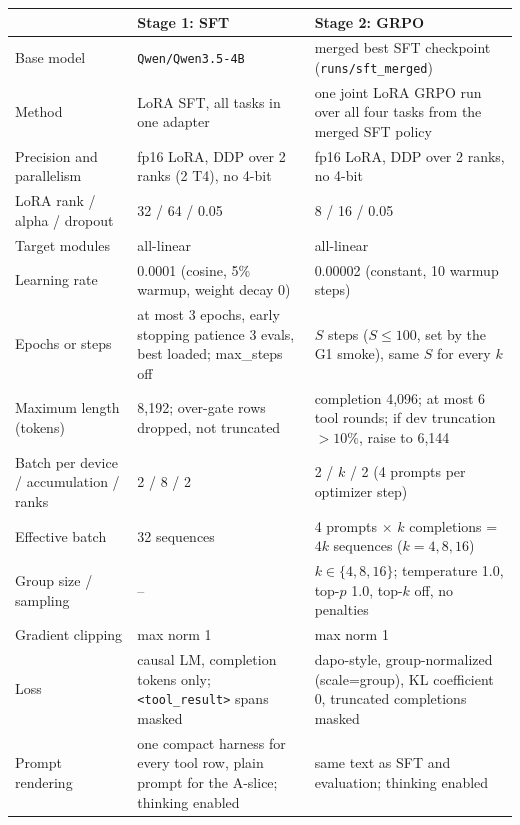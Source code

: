 \begingroup\small\renewcommand{\arraystretch}{1.12}
\begin{tabular}{@{}p{4.2cm}p{5.4cm}p{5.6cm}@{}}
\toprule
 & Stage 1: SFT & Stage 2: GRPO \\
\midrule
Base model & \texttt{Qwen/Qwen3.5-4B} & merged best SFT checkpoint (\texttt{runs/sft\_merged}) \\
Method & LoRA SFT, all tasks in one adapter & one joint LoRA GRPO run over all four tasks from the merged SFT policy \\
Precision and parallelism & fp16 LoRA, DDP over 2 ranks (2 T4), no 4-bit & fp16 LoRA, DDP over 2 ranks, no 4-bit \\
LoRA rank / alpha / dropout & 32 / 64 / 0.05 & 8 / 16 / 0.05 \\
Target modules & all-linear & all-linear \\
Learning rate & 0.0001 (cosine, 5\% warmup, weight decay 0) & 0.00002 (constant, 10 warmup steps) \\
Epochs or steps & at most 3 epochs, early stopping patience 3 evals, best loaded; max\_steps off & $S$ steps ($S\le100$, set by the G1 smoke), same $S$ for every $k$ \\
Maximum length (tokens) & 8{,}192; over-gate rows dropped, not truncated & completion 4{,}096; at most 6 tool rounds; if dev truncation $>10\%$, raise to 6{,}144 \\
Batch per device / accumulation / ranks & 2 / 8 / 2 & 2 / $k$ / 2 (4 prompts per optimizer step) \\
Effective batch & 32 sequences & 4 prompts $\times$ $k$ completions = $4k$ sequences ($k=4,8,16$) \\
Group size / sampling & -- & $k\in\{4,8,16\}$; temperature 1.0, top-$p$ 1.0, top-$k$ off, no penalties \\
Gradient clipping & max norm 1 & max norm 1 \\
Loss & causal LM, completion tokens only; \texttt{<tool\_result>} spans masked & dapo-style, group-normalized (scale=group), KL coefficient 0, truncated completions masked \\
Prompt rendering & one compact harness for every tool row, plain prompt for the A-slice; thinking enabled & same text as SFT and evaluation; thinking enabled \\
\bottomrule
\end{tabular}\endgroup
